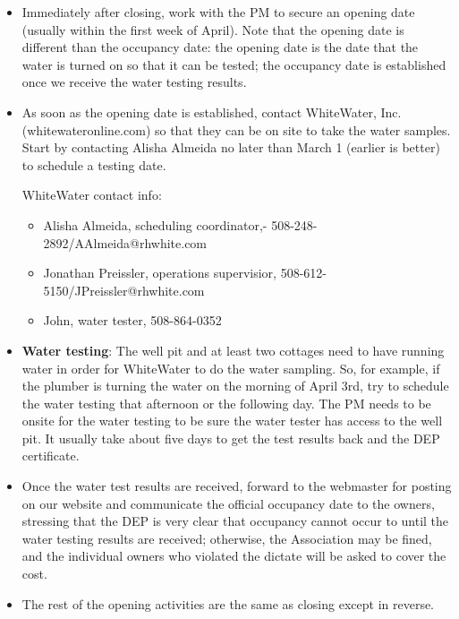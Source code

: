 \documentclass[11pt]{exam}
\begin{document}
\begin{itemize}
\item Immediately after closing, work with the PM to secure an opening date (usually within the first week of April).  Note that the opening date is different than the occupancy date: the opening date is the date that the water is turned on so that it can be tested; the occupancy date is established once we receive the water testing results.
 
\item As soon as the opening date is established, contact WhiteWater, Inc.  (whitewateronline.com) so that they can be on site to take the water samples.  Start by contacting Alisha Almeida no later than March 1 (earlier is better) to schedule a testing date.

WhiteWater contact info:
\begin{itemize}
\item Alisha Almeida, scheduling coordinator,- 508-248-2892/AAlmeida@rhwhite.com
\item Jonathan Preissler, operations supervisior, 508-612-5150/JPreissler@rhwhite.com
\item John, water tester, 508-864-0352 
   \end{itemize} 
    
\item \textbf{Water testing}: The well pit and at least two cottages need to have running water in order for WhiteWater to do the water sampling.  So, for example, if the plumber is turning the water on the morning of April 3rd, try to schedule the water testing that afternoon or the following day.  The PM needs to be onsite for the water testing to be sure the water tester has access to the well pit. It usually take about five days to get the test results back and the DEP certificate. 

 
\item Once the water test results are received, forward to the webmaster for posting on our website and communicate the official occupancy date to the owners, stressing that 
the DEP is very clear that occupancy cannot occur to until  the water testing results are received; otherwise, 
the Association may be fined, and the individual owners who violated the dictate will be asked to cover the cost.
 
\item The rest of the opening activities are the same as closing except in reverse.
   \end{itemize}
    
\end{document}
